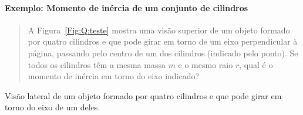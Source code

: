 \paragraph{Exemplo: Momento de inércia de um conjunto de cilindros}

\begin{quote}
A Figura~\ref{Fig:Q:teste} mostra uma visão superior de um objeto formado por quatro cilindros e que pode girar em torno de um eixo perpendicular à página, passando pelo centro de um dos cilindros (indicado pelo ponto). Se todos os cilindros têm a mesma massa $m$ e o mesmo raio $r$, qual é o momento de inércia em torno do eixo indicado?
\end{quote}

\begin{marginfigure}[-1cm]
\centering
{}
\caption{Visão lateral de um objeto formado por quatro cilindros e que pode girar em torno do eixo de um deles.\label{Fig:Q:teste}}
\end{marginfigure}

